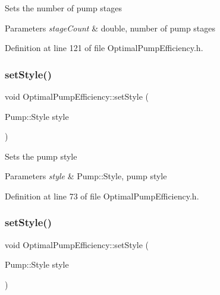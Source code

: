 Sets the number of pump stages 
\begin{DoxyParams}{Parameters}
{\em stage\+Count} & double, number of pump stages \\
\hline
\end{DoxyParams}


Definition at line 121 of file Optimal\+Pump\+Efficiency.\+h.

\mbox{\label{class_optimal_pump_efficiency_ab6b85c8c08d6641c5375c65436f16a2f}} 
\subsubsection{\texorpdfstring{set\+Style()}{setStyle()}\hspace{0.1cm}{\footnotesize\ttfamily [1/3]}}
{\footnotesize\ttfamily void Optimal\+Pump\+Efficiency\+::set\+Style (\begin{DoxyParamCaption}\item[{Pump\+::\+Style}]{style }\end{DoxyParamCaption})\hspace{0.3cm}{\ttfamily [inline]}}

Sets the pump style 
\begin{DoxyParams}{Parameters}
{\em style} & Pump\+::\+Style, pump style \\
\hline
\end{DoxyParams}


Definition at line 73 of file Optimal\+Pump\+Efficiency.\+h.

\mbox{\label{class_optimal_pump_efficiency_ab6b85c8c08d6641c5375c65436f16a2f}} 
\subsubsection{\texorpdfstring{set\+Style()}{setStyle()}\hspace{0.1cm}{\footnotesize\ttfamily [2/3]}}
{\footnotesize\ttfamily void Optimal\+Pump\+Efficiency\+::set\+Style (\begin{DoxyParamCaption}\item[{Pump\+::\+Style}]{style }\end{DoxyParamCaption})\hspace{0.3cm}{\ttfamily [inline]}}

